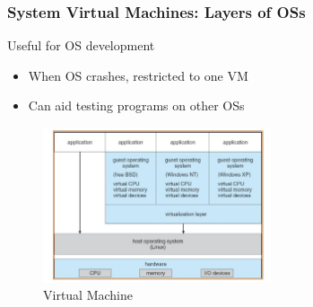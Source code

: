 \subsubsection{System Virtual Machines: Layers of OSs}
Useful for OS development
\begin{itemize}
    \item When OS crashes, restricted to one VM
    \item Can aid testing programs on other OSs
\end{itemize}
\begin{figure}[H]
    \centering
    \includegraphics[width = 0.6\textwidth ]{figures/vm.jpg}
    \caption{Virtual Machine}
\end{figure}







